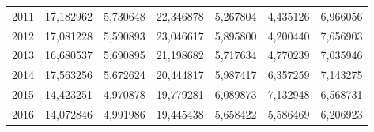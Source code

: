 \begin{table}
\begin{tabular}{p{1cm}p{2cm}p{2cm}p{2cm}p{2cm}p{2cm}p{2cm}}
 2011 &                       17,182962 &  5,730648 &                                    22,346878 &                       5,267804 &          4,435126 & 6,966056 \\
 2012 &                       17,081228 &  5,590893 &                                    23,046617 &                       5,895800 &          4,200440 & 7,656903 \\
 2013 &                       16,680537 &  5,690895 &                                    21,198682 &                       5,717634 &          4,770239 & 7,035946 \\
 2014 &                       17,563256 &  5,672624 &                                    20,444817 &                       5,987417 &          6,357259 & 7,143275 \\
 2015 &                       14,423251 &  4,970878 &                                    19,779281 &                       6,089873 &          7,132948 & 6,568731 \\
 2016 &                       14,072846 &  4,991986 &                                    19,445438 &                       5,658422 &          5,586469 & 6,206923 \\
\bottomrule
\end{tabular}
\end{table}
